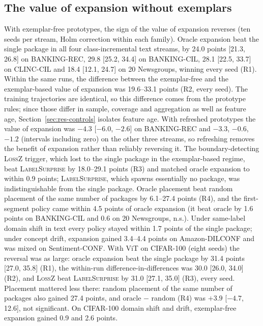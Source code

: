 \documentclass[10pt]{article}
\newcommand{\ls}{\textsc{LabelSurprise}}
\begin{document}
\subsection{The value of expansion without exemplars}
\label{sec:res-ef}
With exemplar-free prototypes, the sign of the value of expansion reverses (ten seeds per stream, Holm correction within each family). Oracle expansion beat the single package in all four class-incremental text streams, by 24.0 points [21.3, 26.8] on BANKING-REC, 29.8 [25.2, 34.4] on BANKING-CIL, 28.1 [22.5, 33.7] on CLINC-CIL and 18.4 [12.1, 24.7] on 20 Newsgroups, winning every seed (R1). Within the same runs, the difference between the exemplar-free and the exemplar-based value of expansion was 19.6--33.1 points (R2, every seed). The training trajectories are identical, so this difference comes from the prototype rules; since those differ in sample, coverage and aggregation as well as feature age, Section~\ref{sec:res-controls} isolates feature age. With refreshed prototypes the value of expansion was $-4.3$ [$-6.0$, $-2.6$] on BANKING-REC and $-3.3$, $-0.6$, $-1.2$ (intervals including zero) on the other three streams, so refreshing removes the benefit of expansion rather than reliably reversing it. The boundary-detecting \textsc{LossZ} trigger, which lost to the single package in the exemplar-based regime, beat \ls{} by 18.0--29.1 points (R3) and matched oracle expansion to within 0.9 points; \ls{}, which spawns essentially no package, was indistinguishable from the single package. Oracle placement beat random placement of the same number of packages by 6.1--27.4 points (R4), and the first-segment policy came within 4.5 points of oracle expansion (it beat oracle by 1.6 points on BANKING-CIL and 0.6 on 20 Newsgroups, n.s.). Under same-label domain shift in text every policy stayed within 1.7 points of the single package; under concept drift, expansion gained 3.4--4.4 points on Amazon-DILCONF and was mixed on Sentiment-CONF. With ViT on CIFAR-100 (eight seeds) the reversal was as large: oracle expansion beat the single package by 31.4 points [27.0, 35.8] (R1), the within-run difference-in-differences was 30.0 [26.0, 34.0] (R2), and \textsc{LossZ} beat \ls{} by 31.0 [27.1, 35.0] (R3), every seed. Placement mattered less there: random placement of the same number of packages also gained 27.4 points, and oracle $-$ random (R4) was $+3.9$ [$-4.7$, 12.6], not significant. On CIFAR-100 domain shift and drift, exemplar-free expansion gained 0.9 and 2.6 points.
\end{document}
